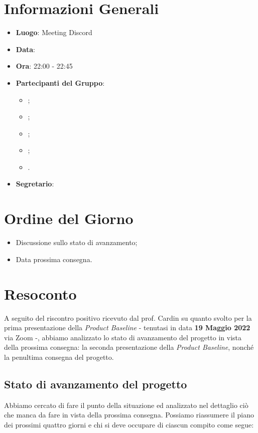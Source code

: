 \section{Informazioni Generali}

\begin{itemize}
	\item{\textbf{Luogo}}: Meeting Discord
	\item{\textbf{Data}}: \D
	\item{\textbf{Ora}}: 22:00 - 22:45
	\item{\textbf{Partecipanti del Gruppo}}:
	\begin{itemize}
		\item{\FP{};}
		\item{\GC{};}
		\item{\LW{};}
		\item{\MG{};}
		\item{\PV{}.}
	\end{itemize}
	\item{\textbf{Segretario}}: \GC{}
\end{itemize}

\section{Ordine del Giorno}
\begin{itemize}
	\item{Discussione sullo stato di avanzamento;}
	\item{Data prossima consegna.}
\end{itemize}

\section{Resoconto}

A seguito del riscontro positivo ricevuto dal prof. Cardin su quanto svolto per la prima presentazione della \textit{Product Baseline} - tenutasi in data \textbf{19 Maggio 2022} via Zoom -, abbiamo analizzato lo stato di avanzamento del progetto in vista della prossima consegna: la seconda presentazione della \textit{Product Baseline}, nonché la penultima consegna del progetto. 

\subsection{Stato di avanzamento del progetto}

Abbiamo cercato di fare il punto della situazione ed analizzato nel dettaglio ciò che manca da fare in vista della prossima consegna. 
Possiamo riassumere il piano dei prossimi quattro giorni e chi si deve occupare di ciascun compito come segue:

